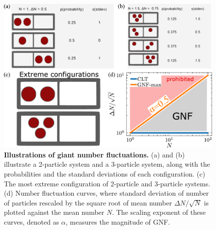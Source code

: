  \begin{figure}[h]
 	\begin{center}
 	\includegraphics[width=5 in]{Figs/1-Intro/GNF/GNF-illustration.pdf}
 	\end{center}
 	\caption[Illustrations of giant number fluctuations]
 	{
	\textbf{Illustrations of giant number fluctuations.}
	(a) and (b) illustrate a 2-particle system and a 3-particle system, along with the probabilities and the standard deviations of each configuration.
	(c) The most extreme configuration of 2-particle and 3-particle systems.
	(d) Number fluctuation curves, where standard deviation of number of particles rescaled by the square root of mean number $\Delta N/\sqrt N$ is plotted against the mean number $N$. The scaling exponent of these curves, denoted as $\alpha$, measures the magnitude of GNF.
 	}
 	\label{fig:GNF-illustration}
 \end{figure}

